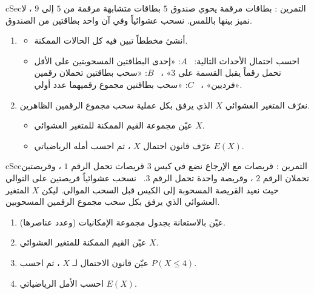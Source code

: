 \documentclass[12pt,a4paper]{article}
\newenvironment{BOX}[2]{\begin{otherlanguage}{english}\begin{arbox}{#1}{#2}}{\end{arbox}\end{otherlanguage}}
\newcounter{exo}
\newenvironment{tamrin}[1]{\stepcounter{exo}\begin{BOX}{cSec}{التمرين \theexo: #1}}{\end{BOX}}
\newenvironment{sq}{\begin{itemize}[leftmargin=2.4em,itemsep=3pt]}{\end{itemize}}
\newcommand{\qa}{\item[(أ)]}\newcommand{\qb}{\item[(ب)]}\newcommand{\qc}{\item[(جـ)]}\newcommand{\qd}{\item[(د)]}\newcommand{\qe}{\item[(هـ)]}
\begin{document}
\begin{tamrin}{بطاقات مرقمة}
يحوي صندوق $5$ بطاقات متشابهة مرقمة من $5$ إلى $9$ ، لا نميز بينها باللمس. نسحب عشوائياً وفي آن واحد بطاقتين من الصندوق.
\begin{enumerate}
\item
\begin{sq}
\qa أنشئ مخططاً تبين فيه كل الحالات الممكنة.
\qb احسب احتمال الأحداث التالية: \ $A$: «إحدى البطاقتين المسحوبتين على الأقل تحمل رقماً يقبل القسمة على $3$» ، \ $B$: «سحب بطاقتين تحملان رقمين فرديين» ، \ $C$: «سحب بطاقتين مجموع رقميهما عدد أولي».
\end{sq}
\item نعرّف المتغير العشوائي $X$ الذي يرفق بكل عملية سحب مجموع الرقمين الظاهرين.
\begin{sq}
\qa عيّن مجموعة القيم الممكنة للمتغير العشوائي $X$.
\qb عرّف قانون احتمال $X$ ، ثم احسب أمله الرياضياتي $E(X)$.
\end{sq}
\end{enumerate}
\end{tamrin}

\begin{tamrin}{قريصات مع الإرجاع}
نضع في كيس $3$ قريصات تحمل الرقم $1$ ، وقريصتين تحملان الرقم $2$ ، وقريصة واحدة تحمل الرقم $3$. \ نسحب عشوائياً قريصتين على التوالي حيث نعيد القريصة المسحوبة إلى الكيس قبل السحب الموالي. ليكن $X$ المتغير العشوائي الذي يرفق بكل سحب مجموع الرقمين المسحوبين.
\begin{enumerate}
\item عيّن بالاستعانة بجدول مجموعة الإمكانيات (وعدد عناصرها).
\item عيّن القيم الممكنة للمتغير العشوائي $X$.
\item عيّن قانون الاحتمال لـ $X$ ، ثم احسب $P(X\le4)$.
\item احسب الأمل الرياضياتي $E(X)$.
\end{enumerate}
\end{tamrin}

\end{document}
